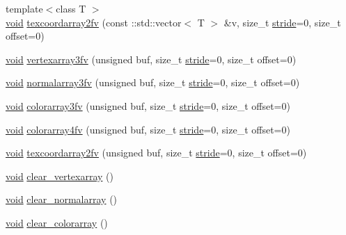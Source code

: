 \begin{DoxyCompactItemize}
\item 
{\footnotesize template$<$class T $>$ }\\\hyperlink{namespacetrimesh_a784ddfd979e1c579bda795a8edfc3f43}{void} \hyperlink{classtrimesh_1_1GLManager_a10e3f70b6d59c4d42733c56a7e9dfe76}{texcoordarray2fv} (const \+::std\+::vector$<$ T $>$ \&v, size\+\_\+t \hyperlink{namespacetrimesh_adbcc86014e77656be1a9df7ecaae5f2f}{stride}=0, size\+\_\+t offset=0)
\item 
\hyperlink{namespacetrimesh_a784ddfd979e1c579bda795a8edfc3f43}{void} \hyperlink{classtrimesh_1_1GLManager_a00eeb9971cd41dfa02cb72ea732267f7}{vertexarray3fv} (unsigned buf, size\+\_\+t \hyperlink{namespacetrimesh_adbcc86014e77656be1a9df7ecaae5f2f}{stride}=0, size\+\_\+t offset=0)
\item 
\hyperlink{namespacetrimesh_a784ddfd979e1c579bda795a8edfc3f43}{void} \hyperlink{classtrimesh_1_1GLManager_a35d97651f164dbd3284ea2cdbffda626}{normalarray3fv} (unsigned buf, size\+\_\+t \hyperlink{namespacetrimesh_adbcc86014e77656be1a9df7ecaae5f2f}{stride}=0, size\+\_\+t offset=0)
\item 
\hyperlink{namespacetrimesh_a784ddfd979e1c579bda795a8edfc3f43}{void} \hyperlink{classtrimesh_1_1GLManager_a15725aee5f1a5c0b2e0a416bd862912d}{colorarray3fv} (unsigned buf, size\+\_\+t \hyperlink{namespacetrimesh_adbcc86014e77656be1a9df7ecaae5f2f}{stride}=0, size\+\_\+t offset=0)
\item 
\hyperlink{namespacetrimesh_a784ddfd979e1c579bda795a8edfc3f43}{void} \hyperlink{classtrimesh_1_1GLManager_afb6e752e605f644da918716d36c468ba}{colorarray4fv} (unsigned buf, size\+\_\+t \hyperlink{namespacetrimesh_adbcc86014e77656be1a9df7ecaae5f2f}{stride}=0, size\+\_\+t offset=0)
\item 
\hyperlink{namespacetrimesh_a784ddfd979e1c579bda795a8edfc3f43}{void} \hyperlink{classtrimesh_1_1GLManager_af1bc046336d0353003cd37495ad0cccd}{texcoordarray2fv} (unsigned buf, size\+\_\+t \hyperlink{namespacetrimesh_adbcc86014e77656be1a9df7ecaae5f2f}{stride}=0, size\+\_\+t offset=0)
\item 
\hyperlink{namespacetrimesh_a784ddfd979e1c579bda795a8edfc3f43}{void} \hyperlink{classtrimesh_1_1GLManager_a6a6153cdc30b0bf920924cf59aa0d39e}{clear\+\_\+vertexarray} ()
\item 
\hyperlink{namespacetrimesh_a784ddfd979e1c579bda795a8edfc3f43}{void} \hyperlink{classtrimesh_1_1GLManager_ab11e9865b68f1481a55429491471eaa9}{clear\+\_\+normalarray} ()
\item 
\hyperlink{namespacetrimesh_a784ddfd979e1c579bda795a8edfc3f43}{void} \hyperlink{classtrimesh_1_1GLManager_a9eead756df240ba86c8d48eed67f7cac}{clear\+\_\+colorarray} ()

\end{DoxyCompactItemize}
